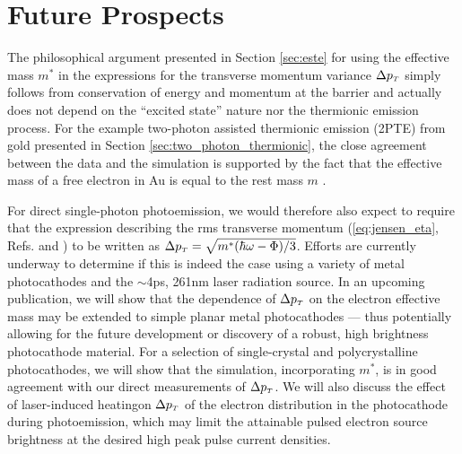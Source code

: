 \section{Future Prospects} \label{sec:photocathode_future}

The philosophical argument presented in Section \ref{sec:este} for using the effective mass $m^*$ in the expressions for the transverse momentum variance $\Delta p_{{\scriptscriptstyle T}}$ simply follows from conservation of energy and momentum at the barrier and actually does not depend on the ``excited state'' nature nor the thermionic emission process.
For the example two-photon assisted thermionic emission (2PTE) from gold presented in Section \ref{sec:two_photon_thermionic}, the close agreement between the data and the simulation is supported by the fact that the effective mass of a free electron in Au is equal to the rest mass $m$ \cite{johnson_optical_1972}.

For direct single-photon photoemission, we would therefore also expect to require that the expression describing the rms transverse momentum (\ref{eq:jensen_eta}, Refs. \cite{dowell_quantum_2009} and \cite{jensen_emittance_2010}) to be written as $\Delta p_{{\scriptscriptstyle T}} = \sqrt{m^* ( \hbar \omega - \Phi ) / 3 }$.
Efforts are currently underway to determine if this is indeed the case using a variety of metal photocathodes and the $\sim$4ps, 261nm laser radiation source.
In an upcoming publication, we will show that the dependence of $\Delta p_{{\scriptscriptstyle T}}$ on the electron effective mass may be extended to simple planar metal photocathodes --- thus potentially allowing for the future development or discovery of a robust, high brightness photocathode material.
For a selection of single-crystal and polycrystalline photocathodes, we will show that the simulation, incorporating $m^*$, is in good agreement with our direct measurements of $\Delta p_{{\scriptscriptstyle T}}$.
We will also discuss the effect of laser-induced heatingon $\Delta p_{{\scriptscriptstyle T}}$ of the electron distribution in the photocathode during photoemission, which may limit the attainable pulsed electron source brightness at the desired high peak pulse current densities.
